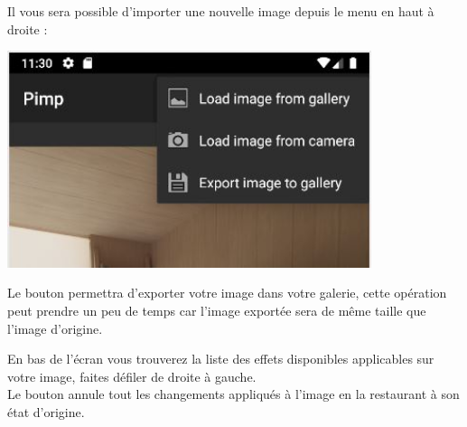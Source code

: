 \begin{center}
\begin{minipage}{.48\textwidth}
    \end{minipage}
    \begin{minipage}{.48\textwidth}
        Il vous sera possible d'importer une nouvelle image depuis le menu {\faChevronCircleDown}  en haut à droite :
        \begin{center}
        \includegraphics[width=0.8\textwidth]{report_src/app_manual/3dot_button_preview.JPG}
        \end{center}    

        Le bouton {\faSave} permettra d'exporter votre image dans votre galerie, cette opération peut prendre un peu de temps car l'image exportée sera de même taille que l'image d'origine.
    \end{minipage}
\end{center}

En bas de l'écran vous trouverez la liste des effets disponibles applicables sur votre image, faites défiler de droite à gauche.
\\

Le bouton {\faMailReply} annule tout les changements appliqués à l'image en la restaurant à son état d'origine.
\clearpage

